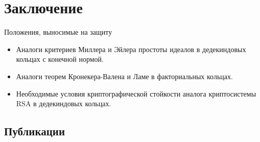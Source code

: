 \documentclass[8pt, xcolor=x11names]{beamer}
\begin{document}
\section{Заключение}

\begin{frame}
    \begin{block}{Положения, выносимые на защиту}
        \begin{itemize}
            \item Аналоги критериев Миллера и Эйлера простоты идеалов в дедекиндовых кольцах с конечной нормой.
            
            \item Аналоги теорем Кронекера-Валена и Ламе в факториальных кольцах.
            
            \item Необходимые условия криптографической стойкости аналога криптосистемы RSA в дедекиндовых кольцах.
        \end{itemize}
    \end{block}
\end{frame}

\subsection{Публикации}
\end{document}
